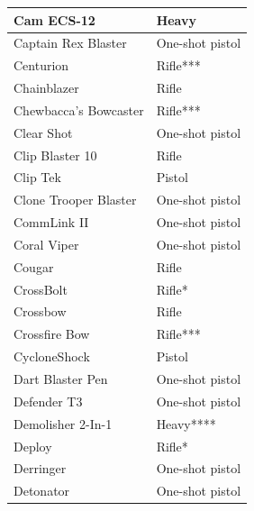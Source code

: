 \begin{table}
\begin{tabular}{|l|l|}
 \hline Cam ECS-12 & Heavy \\
 \hline Captain Rex Blaster & One-shot pistol \\
 \hline Centurion & Rifle*** \\
 \hline Chainblazer & Rifle \\
 \hline Chewbacca's Bowcaster & Rifle*** \\
 \hline Clear Shot & One-shot pistol \\
 \hline Clip Blaster 10 & Rifle \\
 \hline Clip Tek & Pistol \\
 \hline Clone Trooper Blaster & One-shot pistol \\
 \hline CommLink II & One-shot pistol \\
 \hline Coral Viper & One-shot pistol \\
 \hline Cougar & Rifle \\
 \hline CrossBolt & Rifle* \\
 \hline Crossbow & Rifle \\
 \hline Crossfire Bow & Rifle*** \\
 \hline CycloneShock & Pistol \\
 \hline Dart Blaster Pen & One-shot pistol \\
 \hline Defender T3 & One-shot pistol \\
 \hline Demolisher 2-In-1 & Heavy**** \\
 \hline Deploy & Rifle* \\
 \hline Derringer & One-shot pistol \\
 \hline Detonator & One-shot pistol \\
 \hline \end{tabular}

\end{table}

